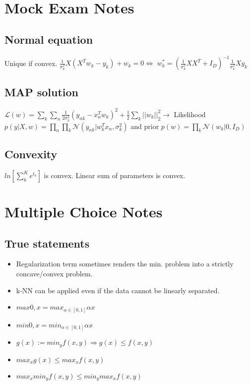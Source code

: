 
\section{Mock Exam Notes}
\subsection{Normal equation}
Unique if convex.\newline
$\frac{1}{\sigma_k^2} X(X^Tw_k-y_k)+w_k = 0 \Leftrightarrow$ \newline
$ w_k^* = (\frac{1}{\sigma_k^2} XX^T+I_D)^{-1} \frac{1}{\sigma_k^2}Xy_k$

\subsection{MAP solution}
$\mathcal{L}(w) = \sum_k \sum_n \frac{1}{2\sigma_k^2} (y_{nk} - x_n^T w_k)^2 + \frac{1}{2} \sum_k ||w_k||^2_2 \rightarrow$
Likelihood $p(y|X,w) = \prod_n \prod_k \mathcal{N}(y_{nk}|w_k^Tx_n, \sigma_k^2)$ and prior $p(w) = \prod_k \mathcal{N}(w_k|0,I_D)$

\subsection{Convexity}
$ln[\sum_k^Ke^{t_k}]$ is convex. Linear sum of parameters is convex.

\section{Multiple Choice Notes}
\subsection{True statements}
\begin{itemize}
\item Regularization term sometimes renders the min. problem into a strictly concave/convex problem.
\item k-NN can be applied even if the data cannot be linearly separated.
\item $max{0, x} = max_{\alpha \in [0,1]} \alpha x$
\item $min{0, x} = min_{\alpha \in [0,1]} \alpha x$
\item $g(x) := min_y f(x,y) \Rightarrow g(x) \le f(x,y)$
\item $max_x g(x) \le max_x f(x,y)$
\item $max_x min_y f(x,y) \le min_y max_x f(x,y)$
\end{itemize}

